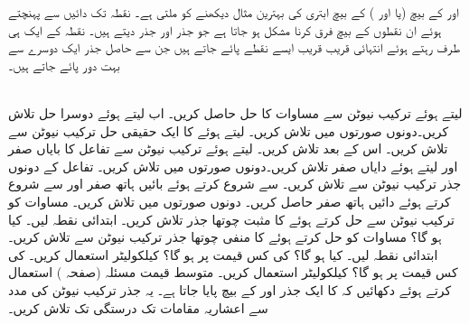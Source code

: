  اور  کے بیچ (یا  اور 
) کے بیچ ابتری کی بہترین مثال دیکھنے کو ملتی ہے۔ نقطہ  تک دائیں سے پہنچتے ہوئے ان نقطوں کے بیچ فرق کرنا مشکل ہو جاتا ہے جو جذر  اور جذر  دیتے ہیں۔ نقطہ  کے ایک ہی طرف رہتے ہوئے  انتہائی قریب قریب ایسے نقطے پائے جاتے ہیں جن سے حاصل جذر ایک دوسرے سے بہت دور پائے جاتے ہیں۔



\\
 لیتے ہوئے ترکیب نیوٹن سے مساوات  کا حل حاصل کریں۔  اب  لیتے ہوئے دوسرا حل تلاش کریں۔دونوں صورتوں میں  تلاش کریں۔
 لیتے ہوئے  کا ایک حقیقی حل ترکیب نیوٹن سے تلاش کریں۔ اس کے بعد  تلاش کریں۔
 لیتے ہوئے ترکیب نیوٹن سے  تفاعل  کا بایاں صفر اور  لیتے ہوئے  دایاں صفر تلاش کریں۔دونوں صورتوں میں  تلاش کریں۔
تفاعل  کے دونوں جذر ترکیب نیوٹن سے تلاش کریں۔  سے شروع کرتے ہوئے بائیں ہاتھ صفر اور سے شروع  کرتے ہوئے دائیں ہاتھ صفر حاصل کریں۔ دونوں صورتوں میں  تلاش کریں۔
مساوات  کو   ترکیب نیوٹن سے   حل کرتے ہوئے  کا مثبت چوتھا جذر تلاش کریں۔ ابتدائی نقطہ  لیں۔ کیا ہو گا؟
مساوات  کو حل کرتے ہوئے  کا منفی چوتھا جذر ترکیب نیوٹن سے  تلاش کریں۔ ابتدائی نقطہ  لیں۔ کیا ہو گا؟
 کی کس قیمت پر  ہو گا؟ کیلکولیٹر استعمال کریں۔
 کی کس قیمت پر  ہو گا؟ کیلکولیٹر استعمال کریں۔
متوسط قیمت مسئلہ (صفحہ ) استعمال کرتے ہوئے دکھائیں کہ  کا ایک جذر  اور  کے بیچ پایا جاتا ہے۔ یہ  جذر  ترکیب نیوٹن کی مدد سے  اعشاریہ مقامات تک درستگی تک تلاش کریں۔

